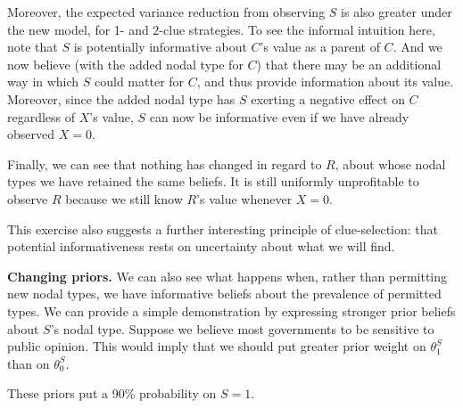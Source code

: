 \documentclass[
  12pt,
]{book}
\begin{document}
Moreover, the expected variance reduction from observing \(S\) is also greater under the new model, for 1- and 2-clue strategies. To see the informal intuition here, note that \(S\) is potentially informative about \(C\)'s value as a parent of \(C\). And we now believe (with the added nodal type for \(C\)) that there may be an additional way in which \(S\) could matter for \(C\), and thus provide information about its value. Moreover, since the added nodal type has \(S\) exerting a negative effect on \(C\) regardless of \(X\)'s value, \(S\) can now be informative even if we have already observed \(X=0\).

Finally, we can see that nothing has changed in regard to \(R\), about whose nodal types we have retained the same beliefs. It is still uniformly unprofitable to observe \(R\) because we still know \(R\)'s value whenever \(X=0\).

This exercise also suggests a further interesting principle of clue-selection: that potential informativeness rests on uncertainty about what we will find.

\textbf{Changing priors.} We can also see what happens when, rather than permitting new nodal types, we have informative beliefs about the prevalence of permitted types. We can provide a simple demonstration by expressing stronger prior beliefs about \(S\)'s nodal type. Suppose we believe most governments to be sensitive to public opinion. This would imply that we should put greater prior weight on \(\theta^S_1\) than on \(\theta^S_0\).

These priors put a 90\% probability on \(S=1\).

\begin{table}

\caption{\label{tab:scxrylearning3}Expected posterior variance from different clue selection strategies. (Stonger priors on S=1)}
\centering
{}
\end{table}
\end{document}
